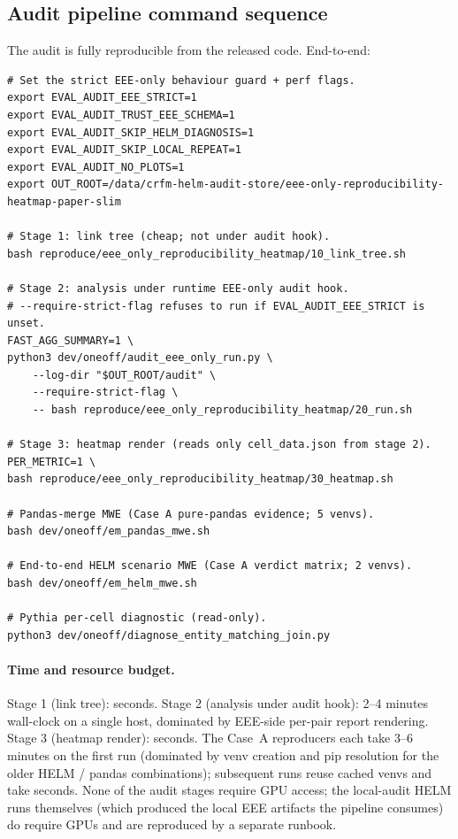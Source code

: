 \documentclass[11pt]{article}
\begin{document}
\subsection{Audit pipeline command sequence}
\label{sec:tr-reproduce-cmds}

The audit is fully reproducible from the released code.
End-to-end:

\begin{lstlisting}[style=shell, caption={Reproducing the slim-paper
  EEE-only HELM audit end-to-end.\label{lst:tr-reproduce}}]
# Set the strict EEE-only behaviour guard + perf flags.
export EVAL_AUDIT_EEE_STRICT=1
export EVAL_AUDIT_TRUST_EEE_SCHEMA=1
export EVAL_AUDIT_SKIP_HELM_DIAGNOSIS=1
export EVAL_AUDIT_SKIP_LOCAL_REPEAT=1
export EVAL_AUDIT_NO_PLOTS=1
export OUT_ROOT=/data/crfm-helm-audit-store/eee-only-reproducibility-heatmap-paper-slim

# Stage 1: link tree (cheap; not under audit hook).
bash reproduce/eee_only_reproducibility_heatmap/10_link_tree.sh

# Stage 2: analysis under runtime EEE-only audit hook.
# --require-strict-flag refuses to run if EVAL_AUDIT_EEE_STRICT is unset.
FAST_AGG_SUMMARY=1 \
python3 dev/oneoff/audit_eee_only_run.py \
    --log-dir "$OUT_ROOT/audit" \
    --require-strict-flag \
    -- bash reproduce/eee_only_reproducibility_heatmap/20_run.sh

# Stage 3: heatmap render (reads only cell_data.json from stage 2).
PER_METRIC=1 \
bash reproduce/eee_only_reproducibility_heatmap/30_heatmap.sh

# Pandas-merge MWE (Case A pure-pandas evidence; 5 venvs).
bash dev/oneoff/em_pandas_mwe.sh

# End-to-end HELM scenario MWE (Case A verdict matrix; 2 venvs).
bash dev/oneoff/em_helm_mwe.sh

# Pythia per-cell diagnostic (read-only).
python3 dev/oneoff/diagnose_entity_matching_join.py
\end{lstlisting}

\paragraph{Time and resource budget.}
Stage 1 (link tree): seconds.
Stage 2 (analysis under audit hook): 2--4 minutes wall-clock on a
  single host, dominated by EEE-side per-pair report rendering.
Stage 3 (heatmap render): seconds.
The Case~A reproducers each take 3--6 minutes on the first run
  (dominated by venv creation and pip resolution for the older HELM
  / pandas combinations); subsequent runs reuse cached venvs and take
  seconds.
None of the audit stages require GPU access; the local-audit HELM
  runs themselves (which produced the local EEE artifacts the pipeline
  consumes) do require GPUs and are reproduced by a separate runbook.
\end{document}
